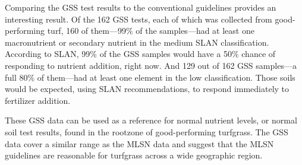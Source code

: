 \documentclass[12pt, a4paper, titlepage]{article}
\begin{document}
Comparing the GSS test results to the conventional guidelines provides an interesting result. Of the 162 GSS tests, each of which was collected from good-performing turf, 160 of them---99\% of the samples---had at least one macronutrient or secondary nutrient in the medium SLAN classification. According to SLAN, 99\% of the GSS samples would have a 50\% chance of responding to nutrient addition, right now. And 129 out of 162 GSS samples---a full 80\% of them---had at least one element in the low classification. Those soils would be expected, using SLAN recommendations, to respond immediately to fertilizer addition.

These GSS data can be used as a reference for normal nutrient levels, or normal soil test results, found in the rootzone of good-performing turfgrass. The GSS data cover a similar range as the MLSN data and suggest that the MLSN guidelines are reasonable for turfgrass across a wide geographic region.

\printbibliography
\end{document}

